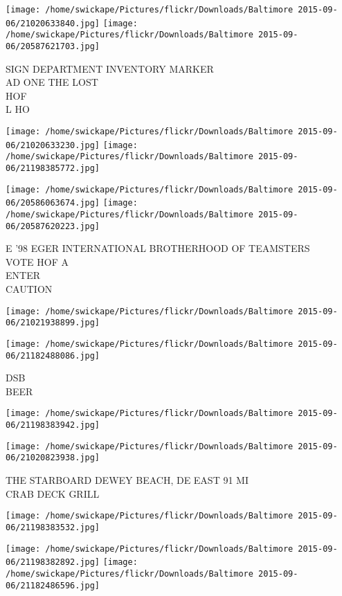 \documentclass[10pt,letterpaper]{article}
\begin{document}
\texttt{[image: /home/swickape/Pictures/flickr/Downloads/Baltimore 2015-09-06/21020633840.jpg]}
\texttt{[image: /home/swickape/Pictures/flickr/Downloads/Baltimore 2015-09-06/20587621703.jpg]}

SIGN DEPARTMENT INVENTORY MARKER\\
AD ONE THE LOST\\
HOF\\
L HO\\
\pagebreak

\texttt{[image: /home/swickape/Pictures/flickr/Downloads/Baltimore 2015-09-06/21020633230.jpg]}
\texttt{[image: /home/swickape/Pictures/flickr/Downloads/Baltimore 2015-09-06/21198385772.jpg]}

\texttt{[image: /home/swickape/Pictures/flickr/Downloads/Baltimore 2015-09-06/20586063674.jpg]}
\texttt{[image: /home/swickape/Pictures/flickr/Downloads/Baltimore 2015-09-06/20587620223.jpg]}

E '98 EGER INTERNATIONAL BROTHERHOOD OF TEAMSTERS\\
VOTE HOF A\\
ENTER\\
CAUTION\\
\pagebreak

\texttt{[image: /home/swickape/Pictures/flickr/Downloads/Baltimore 2015-09-06/21021938899.jpg]}

\vspace{0.25in}
\texttt{[image: /home/swickape/Pictures/flickr/Downloads/Baltimore 2015-09-06/21182488086.jpg]}

DSB\\
BEER\\
\pagebreak

\texttt{[image: /home/swickape/Pictures/flickr/Downloads/Baltimore 2015-09-06/21198383942.jpg]}

\vspace{0.25in}
\texttt{[image: /home/swickape/Pictures/flickr/Downloads/Baltimore 2015-09-06/21020823938.jpg]}

THE STARBOARD DEWEY BEACH, DE EAST 91 MI\\
CRAB DECK GRILL\\
\pagebreak

\texttt{[image: /home/swickape/Pictures/flickr/Downloads/Baltimore 2015-09-06/21198383532.jpg]}

\vspace{0.25in}
\texttt{[image: /home/swickape/Pictures/flickr/Downloads/Baltimore 2015-09-06/21198382892.jpg]}
\texttt{[image: /home/swickape/Pictures/flickr/Downloads/Baltimore 2015-09-06/21182486596.jpg]}
\end{document}
